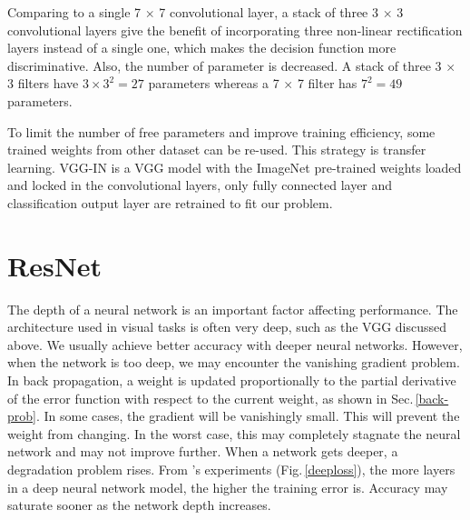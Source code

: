 Comparing to a single 7 $\times$ 7 convolutional layer, a stack of three 3 $\times$ 3 convolutional layers give the benefit of incorporating three non-linear rectification layers instead of a single one, which makes the decision function more discriminative. Also, the number of parameter is decreased. A stack of three 3 $\times$ 3 filters have $3\times3^2 = 27$ parameters whereas a 7 $\times$ 7 filter has $7^2 = 49$ parameters. 

To limit the number of free parameters and improve training efficiency, some trained weights from other dataset can be re-used. This strategy is transfer learning\citep{transfer}. VGG-IN is a VGG model with the ImageNet\citep{imagenet_cvpr09} pre-trained weights\citep{vgg} loaded and locked in the convolutional layers, only fully connected layer and classification output layer are retrained to fit our problem.

\section{ResNet}
\label{arch_resnet}

The depth of a neural network is an important factor affecting performance. The architecture used in visual tasks is often very deep, such as the VGG discussed above. We usually achieve better accuracy with deeper neural networks. However, when the network is too deep, we may encounter the vanishing gradient problem. In back propagation, a weight is updated proportionally to the partial derivative of the error function with respect to the current weight, as shown in Sec.\,\ref{back-prob}. In some cases, the gradient will be vanishingly small. This will prevent the weight from changing. In the worst case, this may completely stagnate the neural network and may not improve further. When a network gets deeper, a degradation problem rises. From \citeauthor{Srivastava2015}'s experiments \cite{Srivastava2015} (Fig.\,\ref{deeploss}), the more layers in a deep neural network model, the higher the training error is. Accuracy may saturate sooner as the network depth increases.

